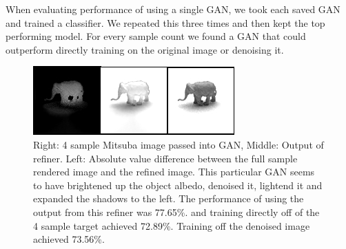 \documentclass[10pt,twocolumn,letterpaper]{article}
\begin{document}
When evaluating performance of using a single GAN, we took each saved GAN and trained a classifier.  We repeated this three times and then kept the top performing model.   For every sample count we found a GAN that could outperform directly training on the original image or denoising it.


\begin{figure}[h!]
\centering
\includegraphics[width=1.0\columnwidth]{./assets/4sampleGAN-onerow.png}
\caption{Right: 4 sample Mitsuba image passed into GAN, Middle: Output of refiner.  Left: Absolute value difference between the full sample rendered image and the refined image. This particular GAN seems to have brightened up the object albedo, denoised it, lightend it and expanded the shadows to the left.  The performance of using the output from this refiner was 77.65\%. and training directly off of the 4 sample target achieved 72.89\%.  Training off the denoised image achieved 73.56\%.}
\label{fig:GAN_4}
\end{figure}
\end{document}
